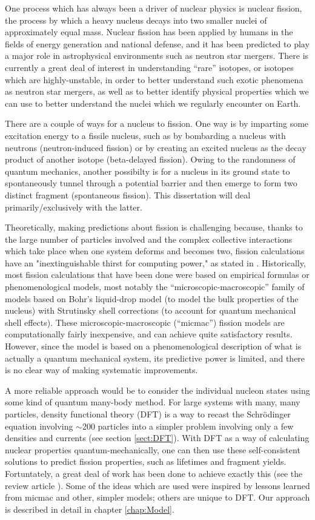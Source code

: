 One process which has always been a driver of nuclear physics is nuclear fission, the process by which a heavy nucleus decays into two smaller nuclei of approximately equal mass. Nuclear fission has been applied by humans in the fields of energy generation and national defense, and it has been predicted to play a major role in astrophysical environments such as neutron star mergers. There is currently a great deal of interest in understanding ``rare'' isotopes, or isotopes which are highly-unstable, in order to better understand such exotic phenomena as neutron star mergers, as well as to better identify physical properties which we can use to better understand the nuclei which we regularly encounter on Earth.

There are  a couple of ways for a nucleus to fission. One way is by imparting some excitation energy to a fissile nucleus, such as by bombarding a nucleus with neutrons (neutron-induced fission) or by creating an excited nucleus as the decay product of another isotope (beta-delayed fission). Owing to the randomness of quantum mechanics, another possibilty is for a nucleus in its ground state to spontaneously tunnel through a potential barrier and then emerge to form two distinct fragment (spontaneous fission). This dissertation will deal primarily/exclusively with the latter.

Theoretically, making predictions about fission is challenging because, thanks to the large number of particles involved and the complex collective interactions which take place when one system deforms and becomes two, fission calculations have an "inextinguishable thirst for computing power," as stated in \cite{Schunck2016-review}. Historically, most fission calculations that have been done were based on empirical formulas or phenomenological models, most notably the ``microscopic-macroscopic'' family of models based on Bohr's liquid-drop model (to model the bulk properties of the nucleus) with Strutinsky shell corrections (to account for quantum mechanical shell effects). These microscopic-macroscopic (``micmac'') fission models are computationally fairly inexpensive, and can achieve quite satisfactory results. However, since the model is based on a phenomenological description of what is actually a quantum mechanical system, its predictive power is limited, and there is no clear way of making systematic improvements.

A more reliable approach would be to consider the individual nucleon states using some kind of quantum many-body method. For large systems with many, many particles, density functional theory (DFT) is a way to recast the Schr\"{o}dinger equation involving $\sim$200 particles into a simpler problem involving only a few densities and currents (see section \ref{sect:DFT}). With DFT as a way of calculating nuclear properties quantum-mechanically, one can then use these self-consistent solutions to predict fission properties, such as lifetimes and fragment yields. Fortuntately, a great deal of work has been done to achieve exactly this (see the review article \cite{Schunck2016-review}). Some of the ideas which are used were inspired by lessons learned from micmac and other, simpler models; others are unique to DFT. Our approach is described in detail in chapter \ref{chap:Model}.

